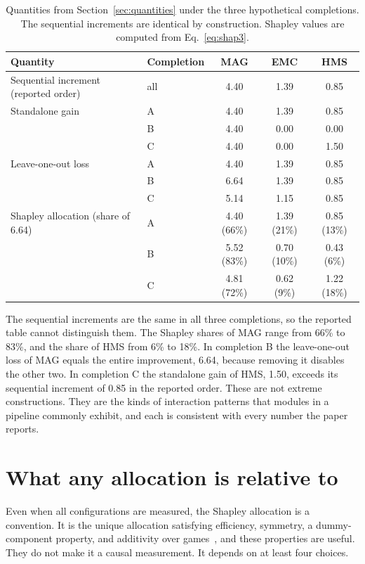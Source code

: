\documentclass[11pt]{article}
\theoremstyle{plain}
\theoremstyle{remark}
\begin{document}
\begin{table}[ht]
\centering\small
\begin{tabular}{llccc}
\toprule
Quantity & Completion & MAG & EMC & HMS\\
\midrule
Sequential increment (reported order) & all & 4.40 & 1.39 & 0.85\\
\midrule
Standalone gain & A & 4.40 & 1.39 & 0.85\\
 & B & 4.40 & 0.00 & 0.00\\
 & C & 4.40 & 0.00 & 1.50\\
\midrule
Leave-one-out loss & A & 4.40 & 1.39 & 0.85\\
 & B & 6.64 & 1.39 & 0.85\\
 & C & 5.14 & 1.15 & 0.85\\
\midrule
Shapley allocation (share of 6.64) & A & 4.40 (66\%) & 1.39 (21\%) & 0.85 (13\%)\\
 & B & 5.52 (83\%) & 0.70 (10\%) & 0.43 (6\%)\\
 & C & 4.81 (72\%) & 0.62 (9\%) & 1.22 (18\%)\\
\bottomrule
\end{tabular}
\caption{Quantities from Section~\ref{sec:quantities} under the three hypothetical completions. The sequential increments are identical by construction. Shapley values are computed from Eq.~\eqref{eq:shap3}.}\label{tab:results}
\end{table}

The sequential increments are the same in all three completions, so the reported table cannot distinguish them. The Shapley shares of MAG range from 66\% to 83\%, and the share of HMS from 6\% to 18\%. In completion B the leave-one-out loss of MAG equals the entire improvement, 6.64, because removing it disables the other two. In completion C the standalone gain of HMS, 1.50, exceeds its sequential increment of 0.85 in the reported order. These are not extreme constructions. They are the kinds of interaction patterns that modules in a pipeline commonly exhibit, and each is consistent with every number the paper reports.

\section{What any allocation is relative to}\label{sec:relative}

Even when all configurations are measured, the Shapley allocation is a convention. It is the unique allocation satisfying efficiency, symmetry, a dummy-component property, and additivity over games~\cite{shapley1953}, and these properties are useful. They do not make it a causal measurement. It depends on at least four choices.
\end{document}
